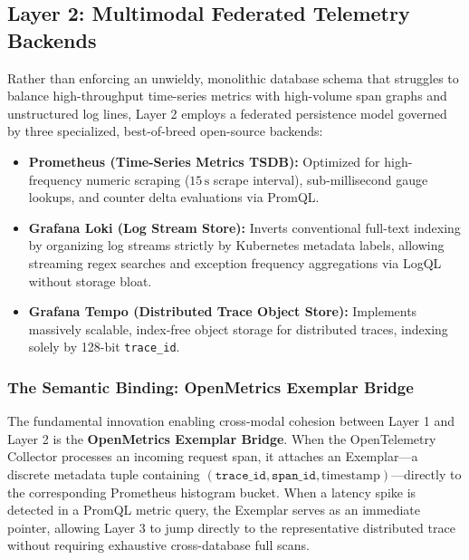 \subsection{Layer 2: Multimodal Federated Telemetry Backends}
Rather than enforcing an unwieldy, monolithic database schema that struggles to balance high-throughput time-series metrics with high-volume span graphs and unstructured log lines, Layer 2 employs a federated persistence model governed by three specialized, best-of-breed open-source backends:
\begin{itemize}[leftmargin=1.2em, itemsep=2pt, topsep=3pt]
    \item \textbf{Prometheus (Time-Series Metrics TSDB):} Optimized for high-frequency numeric scraping ($15\,\text{s}$ scrape interval), sub-millisecond gauge lookups, and counter delta evaluations via PromQL.
    \item \textbf{Grafana Loki (Log Stream Store):} Inverts conventional full-text indexing by organizing log streams strictly by Kubernetes metadata labels, allowing streaming regex searches and exception frequency aggregations via LogQL without storage bloat.
    \item \textbf{Grafana Tempo (Distributed Trace Object Store):} Implements massively scalable, index-free object storage for distributed traces, indexing solely by 128-bit \texttt{trace\_id}.
\end{itemize}

\subsubsection{The Semantic Binding: OpenMetrics Exemplar Bridge}
The fundamental innovation enabling cross-modal cohesion between Layer 1 and Layer 2 is the \textbf{OpenMetrics Exemplar Bridge}. When the OpenTelemetry Collector processes an incoming request span, it attaches an Exemplar—a discrete metadata tuple containing $(\texttt{trace\_id}, \texttt{span\_id}, \text{timestamp})$—directly to the corresponding Prometheus histogram bucket. When a latency spike is detected in a PromQL metric query, the Exemplar serves as an immediate pointer, allowing Layer 3 to jump directly to the representative distributed trace without requiring exhaustive cross-database full scans.

